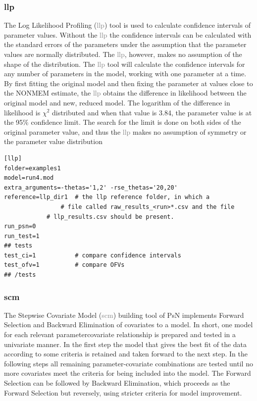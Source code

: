 \documentclass[a4,11pt]{report} \usepackage[pdftex]{graphicx}
\newcommand{\psn}[1]{\textcolor{Grey}{#1}}
\begin{document}
\subsubsection{llp}
The Log Likelihood Profiling (\psn{llp}) tool is used to calculate
confidence intervals of parameter values.  Without the \psn{llp} the
confidence intervals can be calculated with the standard errors of the
parameters under the assumption that the parameter values are normally
distributed. The \psn{llp}, however, makes no assumption of the shape
of the distribution.  The \psn{llp} tool will calculate the confidence
intervals for any number of parameters in the model, working with one
parameter at a time. By first fitting the original model and then
fixing the parameter at values close to the NONMEM estimate, the
\psn{llp} obtains the difference in likelihood between the original
model and new, reduced model. The logarithm of the difference in
likelihood is $\chi^2$ distributed and when that value is 3.84, the
parameter value is at the 95\% confidence limit. The search for the
limit is done on both sides of the original parameter value, and thus
the \psn{llp} makes no assumption of symmetry or the parameter value
distribution

\begin{lstlisting}
[llp]
folder=examples1
model=run4.mod
extra_arguments=-thetas='1,2' -rse_thetas='20,20'
reference=llp_dir1  # the llp reference folder, in which a
	            # file called raw_results_<run>*.csv and the file
		    # llp_results.csv should be present.
run_psn=0
run_test=1
## tests
test_ci=1           # compare confidence intervals
test_ofv=1          # compare OFVs
## /tests
\end{lstlisting}

\subsubsection{scm}
The Stepwise Covariate Model (\psn{scm}) building tool of PsN
implements Forward Selection and Backward Elimination of covariates to
a model. In short, one model for each relevant parametercovariate
relationship is prepared and tested in a univariate manner. In the
first step the model that gives the best fit of the data according to
some criteria is retained and taken forward to the next step. In the
following steps all remaining parameter-covariate combinations are
tested until no more covariates meet the criteria for being included
into the model. The Forward Selection can be followed by Backward
Elimination, which proceeds as the Forward Selection but reversely,
using stricter criteria for model improvement. 
\end{document}
